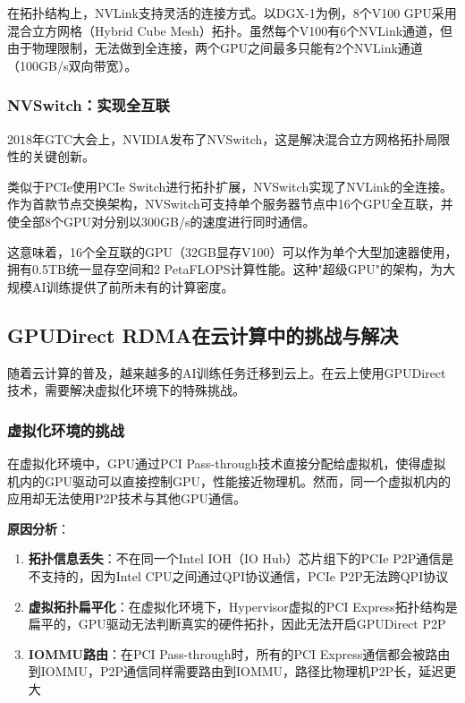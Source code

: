 在拓扑结构上，NVLink支持灵活的连接方式。以DGX-1为例，8个V100 GPU采用混合立方网格（Hybrid Cube Mesh）拓扑。虽然每个V100有6个NVLink通道，但由于物理限制，无法做到全连接，两个GPU之间最多只能有2个NVLink通道（100GB/s双向带宽）。

\subsubsection{NVSwitch：实现全互联}

2018年GTC大会上，NVIDIA发布了NVSwitch，这是解决混合立方网格拓扑局限性的关键创新。

类似于PCIe使用PCIe Switch进行拓扑扩展，NVSwitch实现了NVLink的全连接。作为首款节点交换架构，NVSwitch可支持单个服务器节点中16个GPU全互联，并使全部8个GPU对分别以300GB/s的速度进行同时通信。

这意味着，16个全互联的GPU（32GB显存V100）可以作为单个大型加速器使用，拥有0.5TB统一显存空间和2 PetaFLOPS计算性能。这种"超级GPU"的架构，为大规模AI训练提供了前所未有的计算密度。

\subsection{GPUDirect RDMA在云计算中的挑战与解决}

随着云计算的普及，越来越多的AI训练任务迁移到云上。在云上使用GPUDirect技术，需要解决虚拟化环境下的特殊挑战。

\subsubsection{虚拟化环境的挑战}

在虚拟化环境中，GPU通过PCI Pass-through技术直接分配给虚拟机，使得虚拟机内的GPU驱动可以直接控制GPU，性能接近物理机。然而，同一个虚拟机内的应用却无法使用P2P技术与其他GPU通信。

\textbf{原因分析}：
\begin{enumerate}
    \item \textbf{拓扑信息丢失}：不在同一个Intel IOH（IO Hub）芯片组下的PCIe P2P通信是不支持的，因为Intel CPU之间通过QPI协议通信，PCIe P2P无法跨QPI协议
    \item \textbf{虚拟拓扑扁平化}：在虚拟化环境下，Hypervisor虚拟的PCI Express拓扑结构是扁平的，GPU驱动无法判断真实的硬件拓扑，因此无法开启GPUDirect P2P
    \item \textbf{IOMMU路由}：在PCI Pass-through时，所有的PCI Express通信都会被路由到IOMMU，P2P通信同样需要路由到IOMMU，路径比物理机P2P长，延迟更大
\end{enumerate}

